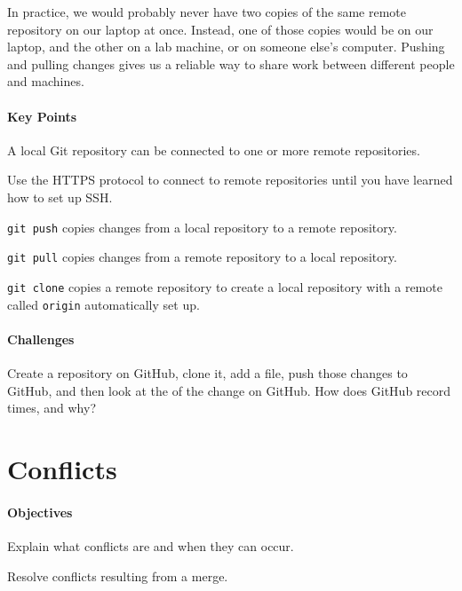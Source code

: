 \documentclass{book}
\begin{document}
In practice, we would probably never have two copies of the same remote
repository on our laptop at once. Instead, one of those copies would be
on our laptop, and the other on a lab machine, or on someone else's
computer. Pushing and pulling changes gives us a reliable way to share
work between different people and machines.

\mbox{}\paragraph{Key Points}

\begin{swcitemize}
\item
  A local Git repository can be connected to one or more remote
  repositories.
\item
  Use the HTTPS protocol to connect to remote repositories until you
  have learned how to set up SSH.
\item
  \texttt{git push} copies changes from a local repository to a remote
  repository.
\item
  \texttt{git pull} copies changes from a remote repository to a local
  repository.
\item
  \texttt{git clone} copies a remote repository to create a local
  repository with a remote called \texttt{origin} automatically set up.
\end{swcitemize}

\mbox{}\paragraph{Challenges}

\begin{swcenumerate}
\item
  Create a repository on GitHub, clone it, add a file, push those
  changes to GitHub, and then look at the
   of the change on GitHub. How does
  GitHub record times, and why?
\end{swcenumerate}

\section{Conflicts}

\mbox{}\paragraph{Objectives}

\begin{swcitemize}
\item
  Explain what conflicts are and when they can occur.
\item
  Resolve conflicts resulting from a merge.
\end{swcitemize}
\end{document}
